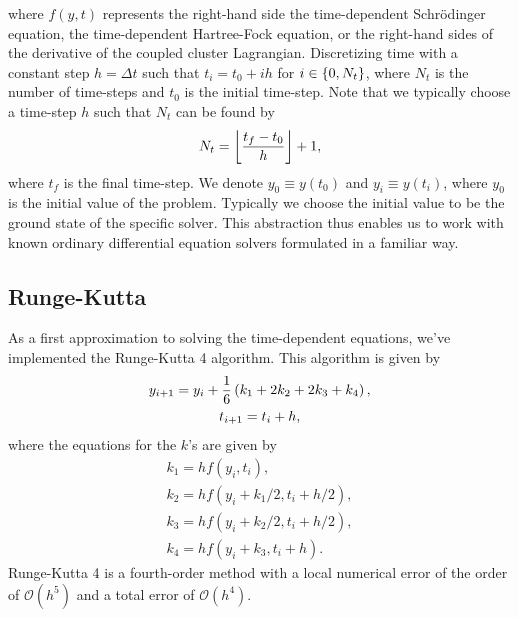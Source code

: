             where $f(y, t)$ represents the right-hand side the time-dependent
            Schrödinger equation, the time-dependent Hartree-Fock equation, or
            the right-hand sides of the derivative of the coupled cluster
            Lagrangian.
            Discretizing time with a constant step $h = \Delta t$ such that $t_i
            = t_0 + i h$ for $i \in \left\{ 0, N_t \right\}$, where $N_t$ is the number of
            time-steps and $t_0$ is the initial time-step.
            Note that we typically choose a time-step $h$ such that $N_t$ can be
            found by
            \begin{align}
                N_t = \left\lfloor \frac{t_f - t_0}{h} \right\rfloor + 1,
            \end{align}
            where $t_f$ is the final time-step.
            We denote $y_0 \equiv y(t_0)$ and $y_i \equiv y(t_i)$, where $y_0$
            is the initial value of the problem.
            Typically we choose the initial value to be the ground state of the
            specific solver.
            This abstraction thus enables us to work with known ordinary
            differential equation solvers formulated in a familiar way.

        \subsection{Runge-Kutta}
            As a first approximation to solving the time-dependent equations,
            we've implemented the Runge-Kutta 4 algorithm.
            This algorithm is given by \cite{wiki:rk4}
            \begin{gather}
                y_{i + 1} = y_i + \frac{1}{6}\left( 
                    k_1 + 2 k_2 + 2 k_3 + k_4
                 \right), \\
                t_{i + 1} = t_i + h,
            \end{gather}
            where the equations for the $k$'s are given by
            \begin{gather}
                k_1 = h f(y_i, t_i), \\
                k_2 = h f(y_i + k_1 / 2, t_i + h / 2), \\
                k_3 = h f(y_i + k_2 / 2, t_i + h / 2), \\
                k_4 = h f(y_i + k_3, t_i + h).
            \end{gather}
            Runge-Kutta 4 is a fourth-order method with a local numerical error
            of the order of $\mathcal{O}(h^5)$ and a total error of
            $\mathcal{O}(h^4)$.

